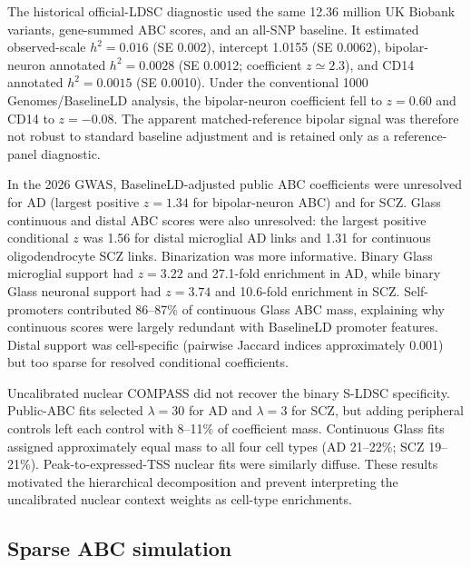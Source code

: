 \documentclass[11pt]{article}
\begin{document}
The historical official-LDSC diagnostic used the same 12.36 million UK Biobank variants, gene-summed ABC scores, and an all-SNP baseline. It estimated observed-scale $h^2=0.016$ (SE 0.002), intercept 1.0155 (SE 0.0062), bipolar-neuron annotated $h^2=0.0028$ (SE 0.0012; coefficient $z\simeq2.3$), and CD14 annotated $h^2=0.0015$ (SE 0.0010). Under the conventional 1000 Genomes/BaselineLD analysis, the bipolar-neuron coefficient fell to $z=0.60$ and CD14 to $z=-0.08$. The apparent matched-reference bipolar signal was therefore not robust to standard baseline adjustment and is retained only as a reference-panel diagnostic.

In the 2026 GWAS, BaselineLD-adjusted public ABC coefficients were unresolved for AD (largest positive $z=1.34$ for bipolar-neuron ABC) and for SCZ. Glass continuous and distal ABC scores were also unresolved: the largest positive conditional $z$ was 1.56 for distal microglial AD links and 1.31 for continuous oligodendrocyte SCZ links. Binarization was more informative. Binary Glass microglial support had $z=3.22$ and 27.1-fold enrichment in AD, while binary Glass neuronal support had $z=3.74$ and 10.6-fold enrichment in SCZ. Self-promoters contributed 86--87\% of continuous Glass ABC mass, explaining why continuous scores were largely redundant with BaselineLD promoter features. Distal support was cell-specific (pairwise Jaccard indices approximately 0.001) but too sparse for resolved conditional coefficients.

Uncalibrated nuclear COMPASS did not recover the binary S-LDSC specificity. Public-ABC fits selected $\lambda=30$ for AD and $\lambda=3$ for SCZ, but adding peripheral controls left each control with 8--11\% of coefficient mass. Continuous Glass fits assigned approximately equal mass to all four cell types (AD 21--22\%; SCZ 19--21\%). Peak-to-expressed-TSS nuclear fits were similarly diffuse. These results motivated the hierarchical decomposition and prevent interpreting the uncalibrated nuclear context weights as cell-type enrichments.

\subsection{Sparse ABC simulation}
\end{document}
